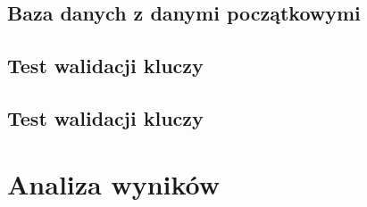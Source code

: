 \subsection{Baza danych z danymi początkowymi}
\subsection{Test walidacji kluczy}
%  

\subsection{Test walidacji kluczy}




\newpage
\section{Analiza wyników}
